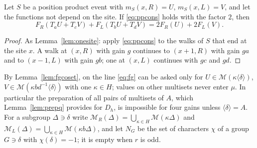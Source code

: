 \begin{lemma}\label{lem:fgonesite}
Let $S$ be a position product event with $m_S(x,R)=U$, $m_S(x,L)=V$, and let the functions not depend on the site. If \eqref{eq:ppcons} holds with the factor $2$, then
\begin{equation}\label{eq:fg}
F_R(T_aU+T_cV)+F_L(T_bU+T_dV)=2F_R(U)+2F_L(V).
\end{equation}
\end{lemma}
\begin{proof}
As Lemma~\ref{lem:onesite}: apply \eqref{eq:ppcons} to the walks of $S$ that end at the site $x$. A walk at $(x,R)$ with gain $g$ continues to $(x+1,R)$ with gain $ga$ and to $(x-1,L)$ with gain $gb$; one at $(x,L)$ continues with $gc$ and $gd$.
\end{proof}

By Lemma~\ref{lem:fgcoset}, on the line \eqref{eq:fg} can be asked only for $U\in\mathcal{M}(\kappa\langle\delta\rangle)$, $V\in\mathcal{M}(\kappa bd^{-1}\langle\delta\rangle)$ with one $\kappa\in H$; values on other multisets never enter $\mu$. In particular the preparation of all pairs of multisets of $A$, which Lemma~\ref{lem:prepq} provides for $D_h$, is impossible for four gains unless $\langle\delta\rangle=A$. For a subgroup $\Delta\ni\delta$ write $\mathcal{M}_R(\Delta)=\bigcup_{\kappa\in H}\mathcal{M}(\kappa\Delta)$ and $\mathcal{M}_L(\Delta)=\bigcup_{\kappa\in H}\mathcal{M}(\kappa b\Delta)$, and let $N_G$ be the set of characters $\chi$ of a group $G\ni\delta$ with $\chi(\delta)=-1$; it is empty when $r$ is odd.

